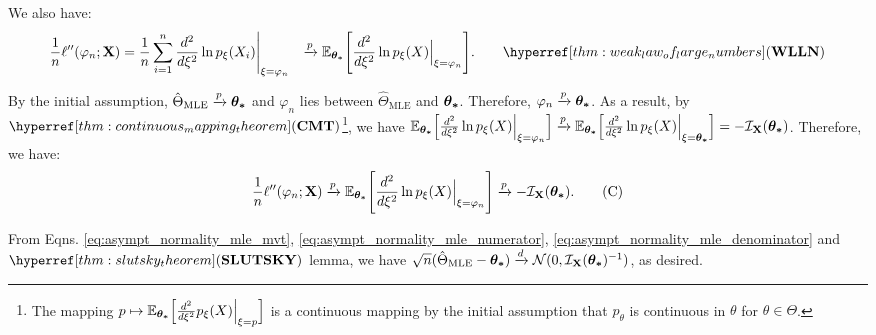 \begin{proof*}
    \noindent We also have:
    \begin{align*}
        \frac{1}{n}\ell''(\varphi_n;\bX) &= \frac{1}{n} \sum_{i=1}^n \frac{d^2}{d\xi^2}\ln p_\xi(X_i)\Bigg|_{\xi=\varphi_n} 
        &\xrightarrow{p} \E_{\btheta}\biggSquare{\frac{d^2}{d\xi^2}\ln p_\xi(X)\Big|_{\xi=\varphi_n}}. \qquad \WLLN
    \end{align*} 

    \noindent By the initial assumption, $\hat\Theta_\mathrm{MLE}\xrightarrow{p}\boldsymbol{\theta_*}$ and $\varphi_n$ lies between $\hat\Theta_\mathrm{MLE}$ and $\boldsymbol{\theta_*}$. Therefore, $\varphi_n\xrightarrow{p}\boldsymbol{\theta_*}$. As a result, by $\CMT$\footnote{The mapping $p\mapsto \mathbb{E}_{\boldsymbol{\theta_*}}\Big[ \frac{d^2}{d\xi^2} p_\xi(X)\Big|_{\xi=p} \Big]$ is a continuous mapping by the initial assumption that $p_\theta$ is continuous in $\theta$ for $\theta\in\Theta$.}, we have $\mathbb{E}_{\boldsymbol{\theta_*}}\Big[ \frac{d^2}{d\xi^2}\ln p_\xi(X)\Big|_{\xi=\varphi_n} \Big]\xrightarrow{p}\mathbb{E}_{\boldsymbol{\theta_*}}\Big[ \frac{d^2}{d\xi^2}\ln p_\xi(X)\Big|_{\xi=\boldsymbol{\theta_*}} \Big] = -\mathcal{I}_{{\bf X}}(\boldsymbol{\theta_*})$. Therefore, we have:
    \begin{equation}
        \label{eq:asympt_normality_mle_denominator} 
        \frac{1}{n}\ell''(\varphi_n;{\bf X}) \xrightarrow{p} \mathbb{E}_{\boldsymbol{\theta_*}}\Bigg[ \frac{d^2}{d\xi^2}\ln p_\xi(X)\Big|_{\xi=\varphi_n} \Bigg] \xrightarrow{p} -\mathcal{I}_{{\bf X}}(\boldsymbol{\theta_*}).\tag{C}
    \end{equation} 

    \noindent From Eqns. \ref{eq:asympt_normality_mle_mvt}, \ref{eq:asympt_normality_mle_numerator}, \ref{eq:asympt_normality_mle_denominator} and $\SLUTSKY$ lemma, we have $\sqrt{n}(\hat\Theta_\mathrm{MLE} - \boldsymbol{\theta_*}) \xrightarrow{d}\mathcal{N}(0, \mathcal{I}_{{\bf X}}(\boldsymbol{\theta_*})^{-1})$, as desired.
\end{proof*}